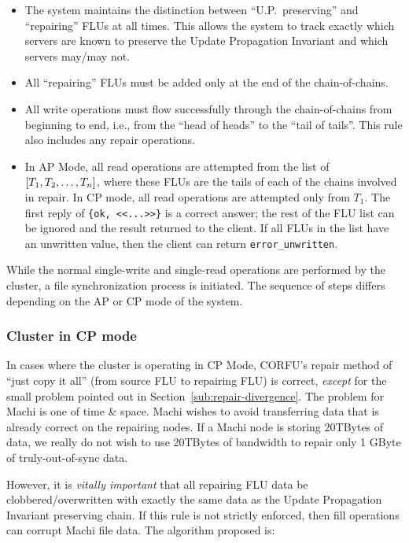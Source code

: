 \documentclass[preprint,10pt]{sigplanconf}
\begin{document}
\begin{itemize}

\item The system maintains the distinction between ``U.P.~preserving''
  and ``repairing'' FLUs at all times.  This allows the system to
  track exactly which servers are known to preserve the Update
  Propagation Invariant and which servers may/may not.

\item All ``repairing'' FLUs must be added only at the end of the
  chain-of-chains.

\item All write operations must flow successfully through the
  chain-of-chains from beginning to end, i.e., from the ``head of
  heads'' to the ``tail of tails''.  This rule also includes any
  repair operations.

\item In AP Mode, all read operations are attempted from the list of
$[T_1,\-T_2,\-\ldots,\-T_n]$, where these FLUs are the tails of each of the
chains involved in repair.
In CP mode, all read operations are attempted only from $T_1$.
The first reply of {\tt \{ok, <<...>>\}} is a correct answer;
the rest of the FLU list can be ignored and the result returned to the
client.  If all FLUs in the list have an unwritten value, then the
client can return {\tt error\_unwritten}.

\end{itemize}

While the normal single-write and single-read operations are performed
by the cluster, a file synchronization process is initiated.  The
sequence of steps differs depending on the AP or CP mode of the system.

\subsubsection{Cluster in CP mode}

In cases where the cluster is operating in CP Mode,
CORFU's repair method of ``just copy it all'' (from source FLU to repairing
FLU) is correct, {\em except} for the small problem pointed out in
Section~\ref{sub:repair-divergence}.  The problem for Machi is one of
time \& space.  Machi wishes to avoid transferring data that is
already correct on the repairing nodes.  If a Machi node is storing
20TBytes of data, we really do not wish to use 20TBytes of bandwidth
to repair only 1 GByte of truly-out-of-sync data.

However, it is {\em vitally important} that all repairing FLU data be
clobbered/overwritten with exactly the same data as the Update
Propagation Invariant preserving chain.  If this rule is not strictly
enforced, then fill operations can corrupt Machi file data.  The
algorithm proposed is:
\end{document}
